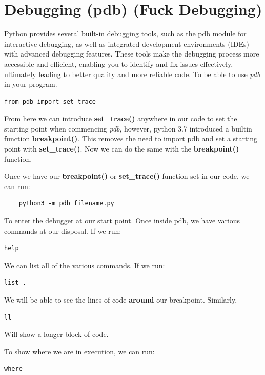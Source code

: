 \documentclass{report}
\begin{document}
    \section{Debugging (pdb) (Fuck Debugging)}
    \bigbreak \noindent
    Python provides several built-in debugging tools, such as the pdb module for interactive debugging, as well as integrated development environments (IDEs) with advanced debugging features. These tools make the debugging process more accessible and efficient, enabling you to identify and fix issues effectively, ultimately leading to better quality and more reliable code.
    \bigbreak \noindent 
    To be able to use \textit{pdb} in your program.
    \begin{verbatim}
from pdb import set_trace 
    \end{verbatim}
    From here we can introduce \textbf{set\_trace()} anywhere in our code to set the starting point when commencing \textit{pdb}, however, python 3.7 introduced a builtin function \textbf{breakpoint()}.
    This removes the need to import pdb and set a starting point with \textbf{set\_trace()}. Now we can do the same with the \textbf{breakpoint()} function.

    \bigbreak \noindent 
    Once we have our \textbf{breakpoint()} or \textbf{set\_trace()} function set in our code, we can run: 
    \begin{verbatim}
    python3 -m pdb filename.py 
    \end{verbatim}
    To enter the debugger at our start point.
    \bigbreak \noindent 
    Once inside pdb, we have various commands at our disposal. If we run:
    \begin{verbatim}
help
    \end{verbatim}
    We can list all of the various commands. If we run:
    \begin{verbatim}
list .
    \end{verbatim}
    We will be able to see the lines of code \textbf{around} our breakpoint.
    \bigbreak \noindent 
    \bigbreak \noindent 
    Similarly, 
    \begin{verbatim}
ll
    \end{verbatim}
    Will show a longer block of code.

    \bigbreak \noindent 
    To show where we are in execution, we can run:
    \begin{verbatim}
where
    \end{verbatim}
\end{document}

